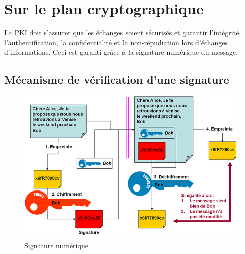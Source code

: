 \documentclass[a4paper,11pt,french]{article}
\begin{document}
\section{Sur le plan cryptographique}
La PKI doit s'assurer que les échanges soient sécurisés et garantir  l'intégrité, l'authentification, la confidentialité et la non-répudiation lors d'échanges d'informations. Ceci est garanti grâce à la signature numérique du message.\\

\subsection{Mécanisme de vérification d'une signature}
\begin{figure}[!h]
\includegraphics[scale=1.025]{signature_num.png} 
\caption{Signature numérique} 
\end{figure} 
\end{document}
